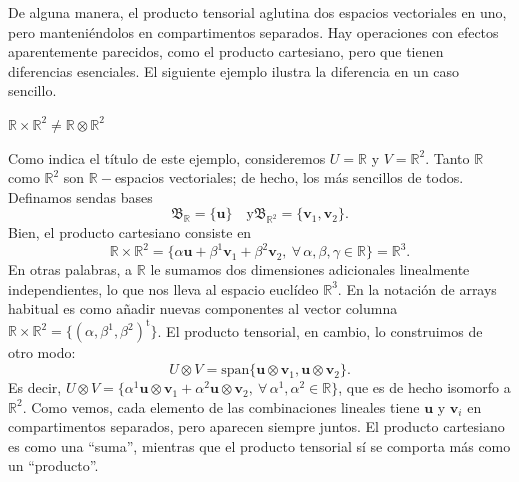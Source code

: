 De alguna manera, el producto tensorial aglutina dos espacios vectoriales en uno, pero manteniéndolos en compartimentos separados. Hay operaciones con efectos aparentemente parecidos, como el producto cartesiano, pero que tienen diferencias esenciales. El siguiente ejemplo ilustra la diferencia en un caso sencillo.
\begin{example}
    {\(\mathbb{R}\times\mathbb{R}^2\neq\mathbb{R}\otimes\mathbb{R}^2\)
    \label{ex.2cartesiano_tensorial}}

    Como indica el título de este ejemplo, consideremos \(U=\mathbb{R}\) y \(V=\mathbb{R}^2\). Tanto \(\mathbb{R}\) como \(\mathbb{R}^2\) son \(\mathbb{R}-\)espacios vectoriales; de hecho, los más sencillos de todos. Definamos sendas bases
    \begin{equation*}
        \mathfrak{B}_\mathbb{R} = \{\mathbf{u}\}\quad \text{y}\mathfrak{B}_{\mathbb{R}^2} = \{\mathbf{v}_1, \mathbf{v}_2\}.
    \end{equation*}
    Bien, el producto cartesiano consiste en 
    \begin{equation*}
        \mathbb{R}\times\mathbb{R}^2 = \{\alpha \mathbf{u} + \beta^1\mathbf{v}_1 + \beta^2\mathbf{v}_2,\ \forall\, \alpha,\beta,\gamma\in\mathbb{R}\} = \mathbb{R}^3.
    \end{equation*}
    En otras palabras, a \(\mathbb{R}\) le sumamos dos dimensiones adicionales linealmente independientes, lo que nos lleva al espacio euclídeo \(\mathbb{R}^3\). En la notación de arrays habitual es como añadir nuevas componentes al vector columna \(\mathbb{R}\times\mathbb{R}^2=\{(\alpha,\beta^1,\beta^2)^\mathrm{t}\}\). El producto tensorial, en cambio, lo construimos de otro modo:
    \begin{equation*}
        U\otimes V = \text{span}\{\mathbf{u}\otimes\mathbf{v}_1, \mathbf{u}\otimes\mathbf{v}_2\}.
    \end{equation*}
    Es decir, \(U\otimes V = \{\alpha^1\mathbf{u}\otimes\mathbf{v}_1 + \alpha^2\mathbf{u}\otimes\mathbf{v}_2,\ \forall\, \alpha^1,\alpha^2\in\mathbb{R}\}\), que es de hecho isomorfo a \(\mathbb{R}^2\). Como vemos, cada elemento de las combinaciones lineales tiene \(\mathbf{u}\) y \(\mathbf{v}_i\) en compartimentos separados, pero aparecen siempre juntos. El producto cartesiano es como una ``suma'', mientras que el producto tensorial sí se comporta más como un ``producto''.


\end{example}
